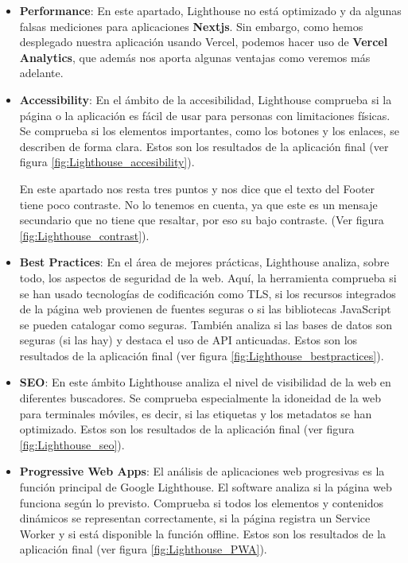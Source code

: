 \documentclass[12pt,twoside,titlepage]{report}
\begin{document}
\begin{itemize}
    \item \textbf{Performance}: En este apartado, Lighthouse no está optimizado y da algunas falsas mediciones para aplicaciones \textbf{Nextjs}. Sin embargo, como hemos desplegado nuestra aplicación usando Vercel, podemos hacer uso de \textbf{Vercel Analytics}, que además nos aporta algunas ventajas como veremos más adelante.
    \item \textbf{Accessibility}: En el ámbito de la accesibilidad, Lighthouse comprueba si la página o la aplicación es fácil de usar para personas con limitaciones físicas. Se comprueba si los elementos importantes, como los botones y los enlaces, se describen de forma clara. Estos son los resultados de la aplicación final (ver figura \ref{fig:Lighthouse_accesibility}).

    En este apartado nos resta tres puntos y nos dice que el texto del Footer tiene poco contraste. No lo tenemos en cuenta, ya que este es un mensaje secundario que no tiene que resaltar, por eso su bajo contraste. (Ver figura \ref{fig:Lighthouse_contrast}).
    \item \textbf{Best Practices}: En el área de mejores prácticas, Lighthouse analiza, sobre todo, los aspectos de seguridad de la web. Aquí, la herramienta comprueba si se han usado tecnologías de codificación como TLS, si los recursos integrados de la página web provienen de fuentes seguras o si las bibliotecas JavaScript se pueden catalogar como seguras. También analiza si las bases de datos son seguras (si las hay) y destaca el uso de API anticuadas. Estos son los resultados de la aplicación final (ver figura \ref{fig:Lighthouse_bestpractices}).
    \item \textbf{SEO}: En este ámbito Lighthouse analiza el nivel de visibilidad de la web en diferentes buscadores. Se comprueba especialmente la idoneidad de la web para terminales móviles, es decir, si las etiquetas y los metadatos se han optimizado. Estos son los resultados de la aplicación final (ver figura \ref{fig:Lighthouse_seo}).
    \item \textbf{Progressive Web Apps}: El análisis de aplicaciones web progresivas es la función principal de Google Lighthouse. El software analiza si la página web funciona según lo previsto. Comprueba si todos los elementos y contenidos dinámicos se representan correctamente, si la página registra un Service Worker y si está disponible la función offline. Estos son los resultados de la aplicación final (ver figura \ref{fig:Lighthouse_PWA}).
\end{itemize}
\end{document}
